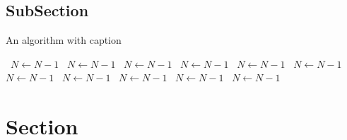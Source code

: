 \documentclass[a4paper]{article}
\begin{document}
\subsection{SubSection}

\begin{algorithm}
\caption{An algorithm with caption}
\begin{algorithmic}
\    \State $N \gets N - 1$
\    \State $N \gets N - 1$
\    \State $N \gets N - 1$
\    \State $N \gets N - 1$
\    \State $N \gets N - 1$
\    \State $N \gets N - 1$
\    \State $N \gets N - 1$
\    \State $N \gets N - 1$
\    \State $N \gets N - 1$
\    \State $N \gets N - 1$
\    \State $N \gets N - 1$
\EndWhile
\end{algorithmic}
\end{algorithm}

\section{Section}
\end{document}

